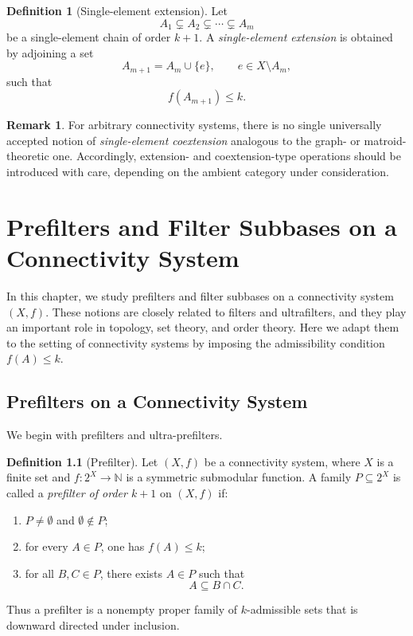 \documentclass[10pt]{book}
\theoremstyle{definition}
\newtheorem{remark}[theorem]{Remark}
\newtheorem{definition}[theorem]{Definition}
\begin{document}
\begin{definition}[Single-element extension]
Let
\[
A_1 \subsetneq A_2 \subsetneq \cdots \subsetneq A_m
\]
be a single-element chain of order \(k+1\).
A \emph{single-element extension} is obtained by adjoining a set
\[
A_{m+1}=A_m\cup \{e\},
\qquad e\in X\setminus A_m,
\]
such that
\[
f(A_{m+1})\leq k.
\]
\end{definition}

\begin{remark}
For arbitrary connectivity systems, there is no single universally accepted notion of \emph{single-element coextension} analogous to the graph- or matroid-theoretic one.
Accordingly, extension- and coextension-type operations should be introduced with care, depending on the ambient category under consideration.
\end{remark}


\newpage
\chapter{Prefilters and Filter Subbases on a Connectivity System}

In this chapter, we study prefilters and filter subbases on a connectivity system \((X,f)\).
These notions are closely related to filters and ultrafilters, and they play an important role in topology, set theory, and order theory.
Here we adapt them to the setting of connectivity systems by imposing the admissibility condition \(f(A)\leq k\).

\section{Prefilters on a Connectivity System}

We begin with prefilters and ultra-prefilters.

\begin{definition}[Prefilter]
\label{def:prefilter}
Let \((X,f)\) be a connectivity system, where \(X\) is a finite set and
\(f:2^X\to \mathbb{N}\) is a symmetric submodular function.
A family \(P\subseteq 2^X\) is called a \emph{prefilter of order \(k+1\)} on \((X,f)\) if:
\begin{enumerate}
    \item[(P1)] \(P\neq \emptyset\) and \(\emptyset\notin P\);
    \item[(P2)] for every \(A\in P\), one has \(f(A)\leq k\);
    \item[(P3)] for all \(B,C\in P\), there exists \(A\in P\) such that
    \[
    A\subseteq B\cap C.
    \]
\end{enumerate}
Thus a prefilter is a nonempty proper family of \(k\)-admissible sets that is downward directed under inclusion.
\end{definition}
\end{document}
